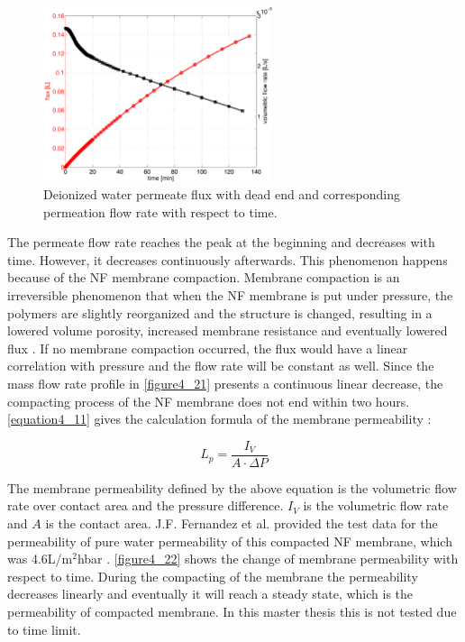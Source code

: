 \begin{figure}[ht]%
\centering
\includegraphics[width=0.6\textwidth]{figures/packagingandtestunderhighpressure/figure4_21.pdf}%
\caption{Deionized water permeate flux with dead end and corresponding permeation flow rate with respect to time.}%
\label{figure4_21}%
\end{figure}

The permeate flow rate reaches the peak at the beginning and decreases with time. However, it decreases continuously afterwards. This phenomenon happens because of the NF membrane compaction. Membrane compaction is an irreversible phenomenon that when the NF membrane is put under pressure, the polymers are slightly reorganized and the structure is changed, resulting in a lowered volume porosity, increased membrane resistance and eventually lowered flux \cite{persson1995study}. If no membrane compaction occurred, the flux would have a linear correlation with pressure and the flow rate will be constant as well. Since the mass flow rate profile in \autoref{figure4_21} presents a continuous linear decrease, the compacting process of the NF membrane does not end within two hours. \autoref{equation4_11} gives the calculation formula of the membrane permeability \cite{waterpermeaility}:

\begin{equation}
    L_p = \frac{I_V}{A\cdot \Delta P}
    \label{equation4_11}
\end{equation}

The membrane permeability defined by the above equation is the volumetric flow rate over contact area and the pressure difference. $I_V$ is the volumetric flow rate and $A$ is the contact area. J.F. Fernandez et al. provided the test data for the permeability of pure water permeability of this compacted NF membrane, which was 4.6L/m$^2$hbar \cite{fernandez2011thinking}. \autoref{figure4_22} shows the change of membrane permeability with respect to time. During the compacting of the membrane the permeability decreases linearly and eventually it will reach a steady state, which is the permeability of compacted membrane. In this master thesis this is not tested due to time limit.\\

